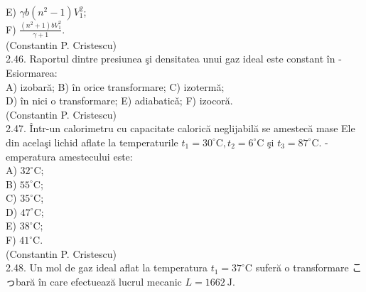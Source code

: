 E) $\gamma b\left(n^{2}-1\right) V_{1}^{2}$;\\
F) $\frac{\left(n^{2}+1\right) b V_{1}^{2}}{\gamma+1}$.\\
(Constantin P. Cristescu)\\
2.46. Raportul dintre presiunea şi densitatea unui gaz ideal este constant în -Esiormarea:\\
A) izobară; B) în orice transformare; C) izotermă;\\
D) în nici o transformare; E) adiabaticǎ; F) izocoră.\\
(Constantin P. Cristescu)\\
2.47. Într-un calorimetru cu capacitate calorică neglijabilă se amestecă mase Ele din acelaşi lichid aflate la temperaturile $t_{1}=30^{\circ} \mathrm{C}, t_{2}=6^{\circ} \mathrm{C}$ şi $t_{3}=87^{\circ} \mathrm{C}$. - emperatura amestecului este:\\
A) $32^{\circ} \mathrm{C}$;\\
B) $55^{\circ} \mathrm{C}$;\\
C) $35^{\circ} \mathrm{C}$;\\
D) $47^{\circ} \mathrm{C}$;\\
E) $38^{\circ} \mathrm{C}$;\\
F) $41^{\circ} \mathrm{C}$.\\
(Constantin P. Cristescu)\\
2.48. Un mol de gaz ideal aflat la temperatura $t_{1}=37^{\circ} \mathrm{C}$ suferă o transformare こっbară în care efectuează lucrul mecanic $L=1662 \mathrm{~J}$.

